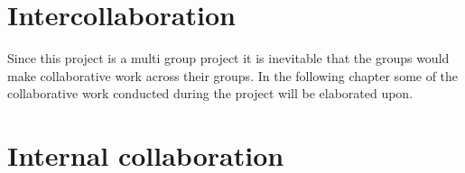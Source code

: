 \chapter{Intercollaboration}\label{CAP:Intercollaboration}
Since this project is a multi group project it is inevitable that the groups would make collaborative work across their groups. 
In the following chapter some of the collaborative work conducted during the project will be elaborated upon. 

\chapter{Internal collaboration}\label{CAP:InternalCollaboration}


